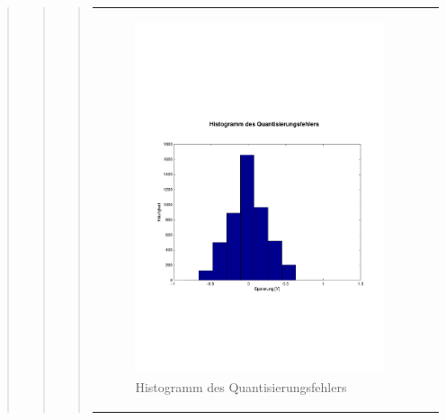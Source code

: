 \begin{quote}
\begin{quote}
\begin{quote}
\begin{center}
\begin{tabular}{ll}
                    \begin{minipage}{0.6\textwidth}
                        \begin{figure}[H]
                            \includegraphics[scale=0.4, trim = 0cm 7cm 0cm
                            7.5cm, clip]
                            {./Bilder/sin8_Histogramm}
                              \caption{Histogramm des Quantisierungsfehlers}
                              \label{sin8_Hist}
                        \end{figure}
                    \end{minipage}
                
                \end{tabular}
            \end{center}
            \vspace{1em}
            

\end{quote}
\end{quote}
\end{quote}
